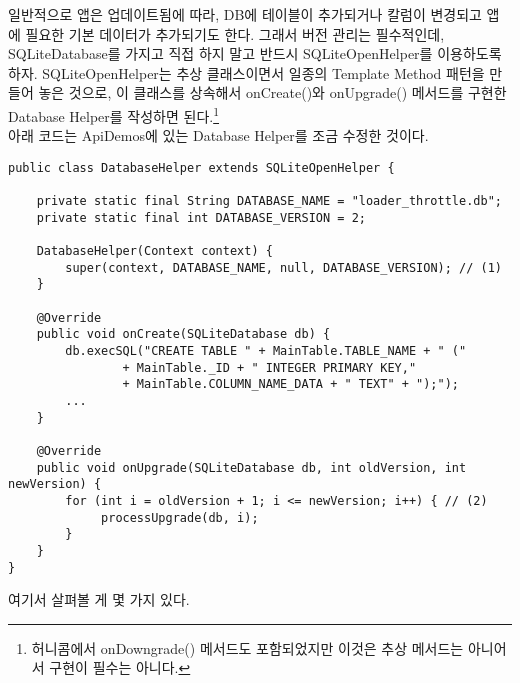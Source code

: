 일반적으로 앱은 업데이트됨에 따라, DB에 테이블이 추가되거나 칼럼이 변경되고 앱에 필요한 기본 데이터가 추가되기도 한다. 
그래서 버전 관리는 필수적인데, SQLiteDatabase를 가지고 직접 하지 말고 반드시 SQLiteOpenHelper를 이용하도록 하자.
SQLiteOpenHelper는 추상 클래스이면서 일종의 Template Method 패턴을 만들어 놓은 것으로, 이 클래스를 상속해서 onCreate()와 onUpgrade() 메서드를 구현한 Database Helper를 작성하면 된다.\footnote{허니콤에서 onDowngrade() 메서드도 포함되었지만 이것은 추상 메서드는 아니어서 구현이 필수는 아니다.}\\

아래 코드는 ApiDemos에 있는 Database Helper를 조금 수정한 것이다.
\begin{lstlisting}[frame=single] 
public class DatabaseHelper extends SQLiteOpenHelper {

	private static final String DATABASE_NAME = "loader_throttle.db";
	private static final int DATABASE_VERSION = 2;

	DatabaseHelper(Context context) {
		super(context, DATABASE_NAME, null, DATABASE_VERSION); // (1)
	}

	@Override
	public void onCreate(SQLiteDatabase db) {
		db.execSQL("CREATE TABLE " + MainTable.TABLE_NAME + " ("
				+ MainTable._ID + " INTEGER PRIMARY KEY,"
				+ MainTable.COLUMN_NAME_DATA + " TEXT" + ");");
		...
	}

	@Override
	public void onUpgrade(SQLiteDatabase db, int oldVersion, int newVersion) {
		for (int i = oldVersion + 1; i <= newVersion; i++) { // (2)
			 processUpgrade(db, i);
		}
	}
}
\end{lstlisting}
여기서 살펴볼 게 몇 가지 있다.
